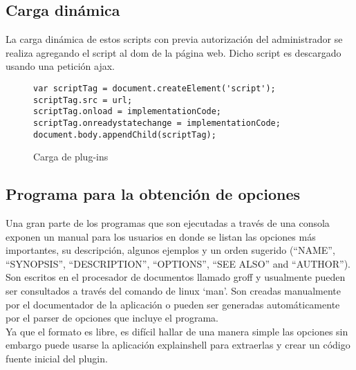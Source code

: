 \subsection{Carga dinámica}
La carga dinámica de estos scripts con previa autorización del administrador se realiza agregando el script al dom de la página web. Dicho script es descargado usando una petición ajax.

\begin{figure}
\begin{lstlisting}
var scriptTag = document.createElement('script');
scriptTag.src = url;
scriptTag.onload = implementationCode;
scriptTag.onreadystatechange = implementationCode;
document.body.appendChild(scriptTag);
\end{lstlisting}
\caption{Carga de plug-ins}
\end{figure}

\subsection{Programa para la obtención de opciones}
Una gran parte de los programas que son ejecutadas a través de una consola exponen un manual para los usuarios en donde se listan las opciones más importantes, su descripción, algunos ejemplos y un orden sugerido (“NAME”, “SYNOPSIS”, “DESCRIPTION”, “OPTIONS”, “SEE ALSO” and “AUTHOR”).
Son escritos en el procesador de documentos llamado groff y usualmente pueden ser consultados a través del comando de linux ‘man’. Son creadas manualmente por el documentador de la aplicación o pueden ser generadas automáticamente por el parser de opciones que incluye el programa.\\

Ya que el formato es libre, es difícil hallar de una manera simple las opciones sin embargo puede usarse la aplicación explainshell \cite{explainshell} para extraerlas y crear un código fuente inicial del plugin.
